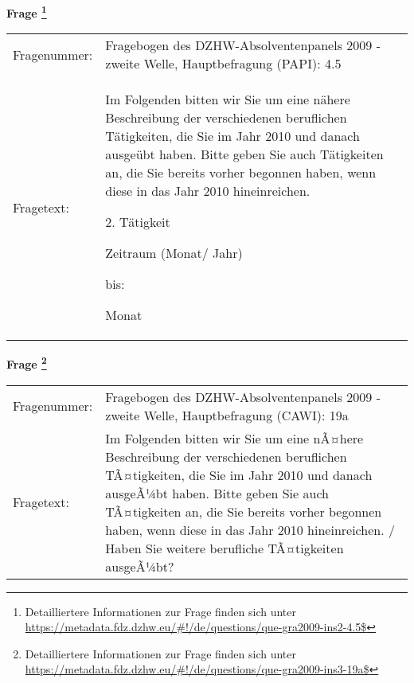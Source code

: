				\vspace*{0.5cm}
                \noindent\textbf{Frage
	                \footnote{Detailliertere Informationen zur Frage finden sich unter
		              \url{https://metadata.fdz.dzhw.eu/\#!/de/questions/que-gra2009-ins2-4.5$}}}\\
				\begin{tabularx}{\hsize}{@{}lX}
					Fragenummer: &
					  Fragebogen des DZHW-Absolventenpanels 2009 - zweite Welle, Hauptbefragung (PAPI):
					  4.5
 \\
					Fragetext: & Im Folgenden bitten wir Sie um eine nähere Beschreibung der verschiedenen beruflichen Tätigkeiten, die Sie im Jahr 2010 und danach ausgeübt haben. Bitte geben Sie auch Tätigkeiten an, die Sie bereits vorher begonnen haben, wenn diese in das Jahr 2010 hineinreichen.\par  2. Tätigkeit\par  Zeitraum (Monat/ Jahr)\par  bis:\par  Monat \\
				\end{tabularx}
				\vspace*{0.5cm}
                \noindent\textbf{Frage
	                \footnote{Detailliertere Informationen zur Frage finden sich unter
		              \url{https://metadata.fdz.dzhw.eu/\#!/de/questions/que-gra2009-ins3-19a$}}}\\
				\begin{tabularx}{\hsize}{@{}lX}
					Fragenummer: &
					  Fragebogen des DZHW-Absolventenpanels 2009 - zweite Welle, Hauptbefragung (CAWI):
					  19a
 \\
					Fragetext: & Im Folgenden bitten wir Sie um eine nÃ¤here Beschreibung der verschiedenen beruflichen TÃ¤tigkeiten, die Sie im Jahr 2010 und danach ausgeÃ¼bt haben. Bitte geben Sie auch TÃ¤tigkeiten an, die Sie bereits vorher begonnen haben, wenn diese in das Jahr 2010 hineinreichen. / Haben Sie weitere berufliche TÃ¤tigkeiten ausgeÃ¼bt? \\
				\end{tabularx}





